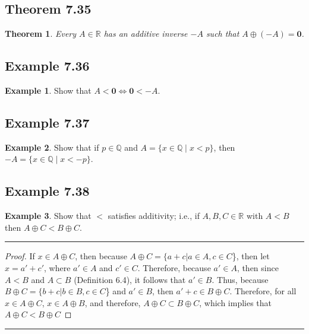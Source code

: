 \documentclass[openany, amssymb, psamsfonts]{amsart}
\newcommand{\bbQ}{\mathbb{Q}}
\newcommand{\bbR}{\mathbb{R}}
\newtheorem{thm}{Theorem}[section]
\theoremstyle{definition}
\newtheorem{exmp}{Example}[section]
\numberwithin{equation}{section}
\begin{document}
\subsection*{Theorem 7.35}
\begin{thm}
\label{7.35}
	Every $A \in \bbR$ has an additive inverse $-A$ such that $A \oplus (-A) = \mathbf{0}$. 
\end{thm}

\subsection*{Example 7.36}
\begin{exmp}
\label{7.36}
	Show that $A < \mathbf{0} \Longleftrightarrow \mathbf{0} < -A$.
\end{exmp}

\subsection*{Example 7.37}
\begin{exmp}
\label{7.37}
	Show that if $p\in\bbQ$ and $A=\{x\in\bbQ\mid x<p\}$, then $-A=\{x\in\bbQ\mid x<-p\}$.
\end{exmp}



\subsection*{Example 7.38}
\begin{exmp}
\label{7.38}
	Show that $<$ satisfies additivity; i.e., if  $A,B,C\in\bbR$ with $A<B$ then $A\oplus C<B\oplus C$. 
\end{exmp}
\vspace{4pt}     \hrule   \vspace{4pt}
\begin{proof}
If $x\in A\oplus C$, then because $A\oplus C = \{a+c | a\in A, c\in C$\}, then let $x=a'+c'$, where $a'\in A$ and $c'\in C$. Therefore, because $a'\in A$, then since $A<B$ and $A\subset B$ (Definition 6.4), it follows that $a'\in B$. Thus, because $B\oplus C = \{b+c | b\in B, c\in C$\} and $a'\in B$, then $a'+c \in B\oplus C$. Therefore, for all $x\in A\oplus C$, $x\in A\oplus B$, and therefore, $A\oplus C \subset B\oplus C$, which implies that $A\oplus C < B\oplus C$
\end{proof}
\vspace{4pt}     \hrule   \vspace{4pt}
\end{document}
